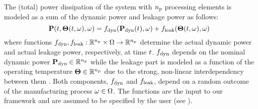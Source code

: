 The (total) power dissipation of the system with ${n_p}$ processing elements is modeled as a sum of the dynamic power and leakage power as follows:
\begin{equation} \elabel{power-model}
  \vP(\t, \vTO(\t, \o), \o) = f_\dyn(\vP_\dyn(\t), \o) + f_\leak(\vTO(\t, \o), \o)
\end{equation}
where functions $f_{\text{dyn}}, f_{\text{leak}}: \mathbb{R}^{n_p} \times \Omega \to \mathbb{R}^{n_p}$ determine the actual dynamic power and actual leakage power, respectively, at time $t$. $f_{\text{dyn}}$ depends on the nominal dynamic power $\mathbf{P}_{\text{dyn}} \in \mathbb{R}^{n_p}$ while the leakage part is modeled as a function of the operating temperature ${\boldsymbol\Theta} \in \mathbb{R}^{n_p}$ due to the strong, non-linear interdependency between them \cite{srivastava2010, liu2007}. Both components, $f_{\text{dyn}}$ and $f_{\text{leak}}$, depend on a random outcome of the manufacturing process $\omega \in \Omega$. The functions are the input to our framework and are assumed to be specified by the user (see ).
